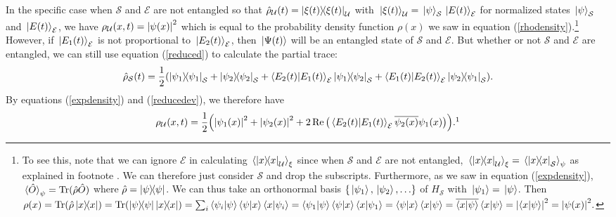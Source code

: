     In the specific case when $\mathcal{S}$ and $\mathcal{E}$ are not entangled so that $\hat{\rho}_\mathcal{U}(t)=\dyad{\xi(t)}_\mathcal{U}$ with $\ket*{\xi(t)}_\mathcal{U}=\ket*{\psi}_\mathcal{S}\ket*{E(t)}_\mathcal{E}$ for normalized states $\ket*{\psi}_\mathcal{S}$ and $\ket*{E(t)}_\mathcal{E}$, we have $\rho_\mathcal{U}(x, t) =\abs{\psi(x)}^2$ which is equal to the probability density function $\rho(x)$ we saw in equation (\ref{rhodensity}).\footnote{To see this, note that we can ignore $\mathcal{E}$ in calculating $\ev*{\dyad{x}_\mathcal{U}}_\xi$ since when $\mathcal{S}$ and $\mathcal{E}$ are not entangled, $\ev*{\dyad{x}_\mathcal{U}}_\xi = \ev*{\dyad{x}_\mathcal{S}}_\psi$ as explained in footnote . We can therefore just consider $\mathcal{S}$ and drop the subscripts.
    Furthermore, as we saw in equation (\ref{expdensity}), $\ev*{\hat{O}}_\psi=\Tr(\hat{\rho}\hat{O})$ where $\hat{\rho}=\dyad{\psi}$. 
    We can thus take an orthonormal basis $\{\ket*{\psi_1},\ket*{\psi_2},\ldots\}$ of $H_\mathcal{S}$ with $\ket*{\psi_1}=\ket*{\psi}$. 
    Then $\rho(x)=\Tr(\hat{\rho}\dyad{x})=\Tr(\dyad{\psi}\dyad{x})=\sum_i\ip{\psi_i}{\psi}\ip{\psi}{x}\ip{x}{\psi_i}=\ip{\psi_1}{\psi}\ip{\psi}{x}\ip{x}{\psi_1} =\ip{\psi}{x}\ip{x}{\psi}=\overline{\ip{x}{\psi}}\ip{x}{\psi}=\abs{\ip{x}{\psi}}^2=\abs{\psi(x)}^2.$} 
    However, if $\ket*{E_1(t)}_\mathcal{E}$ is not proportional to $\ket*{E_2(t)}_\mathcal{E}$, then $\ket*{\Psi(t)}$ will be an entangled state of $\mathcal{S}$ and $\mathcal{E}$. But whether or not $\mathcal{S}$ and $\mathcal{E}$ are entangled, we can still use equation (\ref{reduced}) to calculate the partial trace:
    $$\hat{\rho}_\mathcal{S}(t)=\frac{1}{2}(\dyad{\psi_1}_\mathcal{S}+\dyad{\psi_2}_\mathcal{S}+\ip{E_2(t)}{E_1(t)}_\mathcal{E} \dyad{\psi_1}{\psi_2}_\mathcal{S}+\ip{E_1(t)}{E_2(t)}_\mathcal{E} \dyad{\psi_2}{\psi_1}_\mathcal{S}).$$
    By equations (\ref{expdensity}) and (\ref{reducedev}), we therefore have
    \begin{equation}\rho_\mathcal{U}(x, t)=\frac{1}{2}\Big(\abs{\psi_1(x)}^2+\abs{\psi_2(x)}^2+2\Re\big(\ip{E_2(t)}{E_1(t)}_\mathcal{E}\overline{\psi_2(x)}\psi_1(x)\big)\Big).\protect\footnotemark
    \end{equation}
